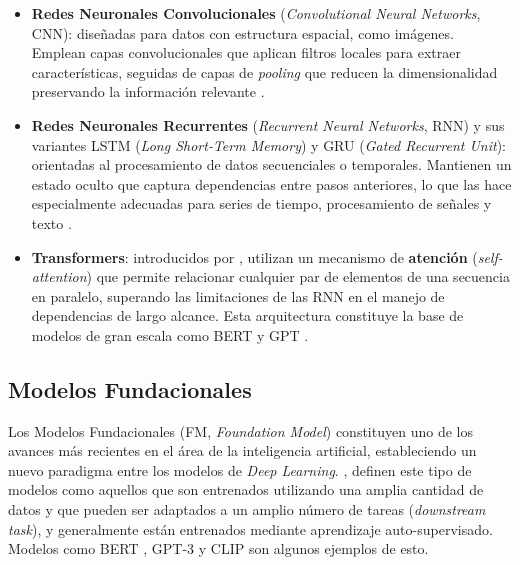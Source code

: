 \begin{itemize}
    \item \textbf{Redes Neuronales Convolucionales} 
    (\textit{Convolutional Neural Networks}, CNN): diseñadas para 
    datos con estructura espacial, como imágenes. Emplean capas 
    convolucionales que aplican filtros locales para extraer 
    características, seguidas de capas de \textit{pooling} que 
    reducen la dimensionalidad preservando la información relevante 
    \textcite{lecun2015deep}.

    \item \textbf{Redes Neuronales Recurrentes} 
    (\textit{Recurrent Neural Networks}, RNN) y sus variantes 
    LSTM (\textit{Long Short-Term Memory}) y GRU 
    (\textit{Gated Recurrent Unit}): orientadas al procesamiento 
    de datos secuenciales o temporales. Mantienen un estado oculto 
    que captura dependencias entre pasos anteriores, lo que las hace 
    especialmente adecuadas para series de tiempo, 
    procesamiento de señales y texto \textcite{shiri2023comprehensive}.
    
    \item \textbf{Transformers}: introducidos por 
    \textcite{vaswani2017attention}, utilizan un mecanismo de 
    \textbf{atención} (\textit{self-attention}) que permite 
    relacionar cualquier par de elementos de una secuencia en 
    paralelo, superando las limitaciones de las RNN en el manejo 
    de dependencias de largo alcance. Esta arquitectura constituye 
    la base de modelos de gran escala como BERT y GPT
    \textcite{bengio2021deep}.
\end{itemize}

\subsection{Modelos Fundacionales}

Los Modelos Fundacionales (FM, \textit{Foundation Model}) constituyen uno de los avances más recientes
en el área de la inteligencia artificial, estableciendo un nuevo paradigma entre los modelos de 
\textit{Deep Learning}. \textcite{DBLP}, definen este tipo de modelos como aquellos que son entrenados utilizando 
una amplia cantidad de datos y que pueden ser adaptados a un amplio número de tareas (\textit{downstream task}), 
y generalmente están entrenados mediante aprendizaje auto-supervisado. Modelos como BERT \parencite{devlin2019bert}, GPT-3 \parencite{brown2020languagemodelsfewshotlearners} y CLIP \parencite{radford2021learningtransferablevisualmodels}
son algunos ejemplos de esto. 

